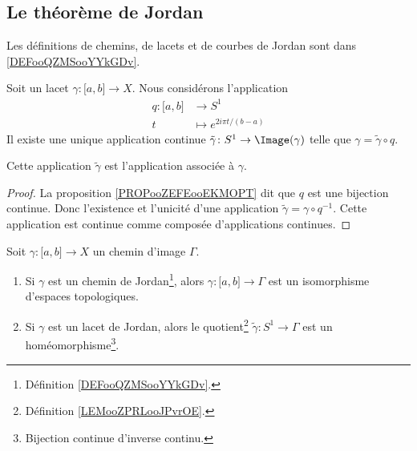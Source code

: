 


\subsection{Le théorème de Jordan}

Les définitions de chemins, de lacets et de courbes de Jordan sont dans \ref{DEFooQZMSooYYkGDv}.

\begin{lemmaDef}     \label{LEMooZPRLooJPvrOE}
	Soit un lacet \( \gamma\colon \mathopen[ a , b \mathclose]\to X\). Nous considérons l'application
	\begin{equation}
		\begin{aligned}
			q\colon \mathopen[ a , b \mathclose] & \to S^1                    \\
			t                                    & \mapsto  e^{2i\pi t/(b-a)}
		\end{aligned}
	\end{equation}
	Il existe une unique application continue \( \tilde \gamma\colon S^1\to \Image(\gamma)\) telle que \( \gamma=\tilde \gamma\circ q\).

	Cette application \( \tilde \gamma\) est l'application  associée à \( \gamma\).
\end{lemmaDef}

\begin{proof}
	La proposition \ref{PROPooZEFEooEKMOPT} dit que \( q\) est une bijection continue. Donc l'existence et l'unicité d'une application \( \tilde \gamma=\gamma\circ q^{-1}\). Cette application est continue comme composée d'applications continues.
\end{proof}

\begin{lemma}     \label{LEMooCGVOooVPlSRD}
	Soit \( \gamma\colon \mathopen[ a , b \mathclose]\to X\) un chemin d'image \( \Gamma\).
	\begin{enumerate}
		\item       \label{ITEMooWKVAooCQDvpL}
		      Si \( \gamma\) est un chemin de Jordan\footnote{Définition \ref{DEFooQZMSooYYkGDv}.}, alors \( \gamma\colon \mathopen[ a , b \mathclose]\to \Gamma\) est un isomorphisme d'espaces topologiques.
		\item       \label{ITEMooVYMXooEtgPJT}
		      Si \( \gamma\) est un lacet de Jordan, alors le quotient\footnote{Définition \ref{LEMooZPRLooJPvrOE}.} \( \tilde \gamma\colon S^1\to \Gamma\) est un homéomorphisme\footnote{Bijection continue d'inverse continu.}.
	\end{enumerate}
\end{lemma}

